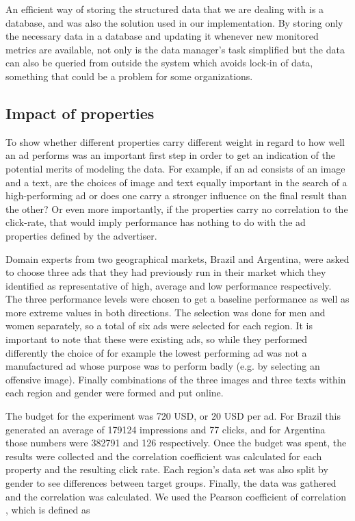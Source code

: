 \documentclass{sig-alternate}
\begin{document}
An efficient way of storing the structured data that we are dealing with is a database, and was also the solution used in our implementation. By storing only the necessary data in a database and updating it whenever new monitored metrics are available, not only is the data manager's task simplified but the data can also be queried from outside the system which avoids lock-in of data, something that could be a problem for some organizations.

\subsection{Impact of properties}
To show whether different properties carry different weight in regard to how well an ad performs was an important first step in order to get an indication of the potential merits of modeling the data. For example, if an ad consists of an image and a text, are the choices of image and text equally important in the search of a high-performing ad or does one carry a stronger influence on the final result than the other? Or even more importantly, if the properties carry no correlation to the click-rate, that would imply performance has nothing to do with the ad properties defined by the advertiser.

Domain experts from two geographical markets, Brazil and Argentina, were asked to choose three ads that they had previously run in their market which they identified as representative of high, average and low performance respectively. The three performance levels were chosen to get a baseline performance as well as more extreme values in both directions. The selection was done for men and women separately, so a total of six ads were selected for each region. It is important to note that these were existing ads, so while they performed differently the choice of for example the lowest performing ad was not a manufactured ad whose purpose was to perform badly (e.g. by selecting an offensive image). Finally combinations of the three images and three texts within each region and gender were formed and put online.

The budget for the experiment was 720 USD, or 20 USD per ad. For Brazil this generated an average of 179124 impressions and 77 clicks, and for Argentina those numbers were 382791 and 126 respectively. Once the budget was spent, the results were collected and the correlation coefficient was calculated for each property and the resulting click rate. Each region's data set was also split by gender to see differences between target groups. Finally, the data was gathered and the correlation was calculated. We used the Pearson coefficient of correlation \cite{Milton2002}, which is defined as
\end{document}
